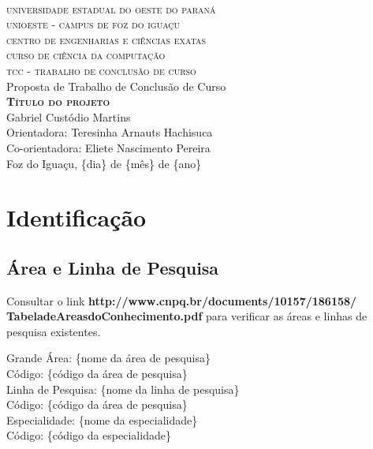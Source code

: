 \documentclass[
	12pt,				%
	a4paper,			%
	english,			%
	brazil,				%
	]{article}
\begin{document}
\begin{center}

	\textsc{
		\large
			\\universidade estadual do oeste do paraná
			\\unioeste - campus de foz do iguaçu
			\\centro de engenharias e ciências exatas
			\\curso de ciência da computação
			\\[1 cm]tcc - trabalho de conclusão de curso
	}
	\\
	[4 cm]
	\large Proposta de Trabalho de Conclusão de Curso
    \\
	\textbf{
	    \textsc{Título do projeto}
    }
	\\[5 cm]Gabriel Custódio Martins
    \\Orientadora: Teresinha Arnauts Hachisuca
    \\Co-orientadora: Eliete Nascimento Pereira
    \\[2 cm]Foz do Iguaçu, \{dia\} de \{mês\} de \{ano\}
    
    
\end{center}

\thispagestyle{empty}

\section{Identificação}
    
    \subsection{Área e Linha de Pesquisa} 
    
    Consultar o link {\bf http://www.cnpq.br/documents/10157/186158/ TabeladeAreasdoConhecimento.pdf} 
    para verificar as áreas e linhas de pesquisa existentes.
    
        \noindent Grande Área: \{nome da área de pesquisa\} 
        \\Código: \{código da área de pesquisa\}
    	\\[1 cm]Linha de Pesquisa: \{nome da linha de pesquisa\} 
    	\\Código: \{código da área de pesquisa\}
    	\\[1 cm]Especialidade: \{nome da especialidade\}
    	\\Código: \{código da especialidade\}
    	
\end{document}
